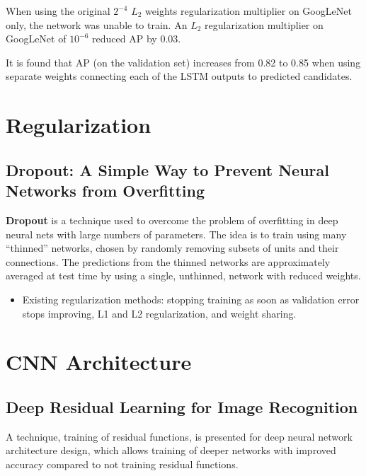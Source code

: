 \documentclass[a4paper, 12pt]{article}
\begin{document}
When using the original $2^{-4}$ $L_2$ weights regularization multiplier on
GoogLeNet only, the network was unable to train.  An $L_2$ regularization
multiplier on GoogLeNet of $10^{-6}$ reduced AP by 0.03.

It is found that AP (on the validation set) increases from 0.82 to 0.85 when
using separate weights connecting each of the LSTM outputs to predicted
candidates.

\section{Regularization}

\subsection{Dropout: A Simple Way to Prevent Neural Networks from
            Overfitting\cite{Srivastava:2014:DSW:2627435.2670313}}
\label{dropout}

\textbf{Dropout} is a technique used to overcome the problem of overfitting in
deep neural nets with large numbers of parameters. The idea is to train using
many ``thinned'' networks, chosen by randomly removing subsets of units and
their connections. The predictions from the thinned networks are approximately
averaged at test time by using a single, unthinned, network with reduced
weights.

\begin{itemize}
        \item Existing regularization methods: stopping training as soon as
                validation error stops improving, L1 and L2 regularization, and
                weight sharing\cite{Nowlan:1992:SNN:148167.148169}.
\end{itemize}

\section{CNN Architecture}

\subsection{Deep Residual Learning for Image
            Recognition\cite{DBLP:journals/corr/HeZRS15}}

A technique, training of residual functions, is presented for deep neural
network architecture design, which allows training of deeper networks with
improved accuracy compared to not training residual functions.
\end{document}

